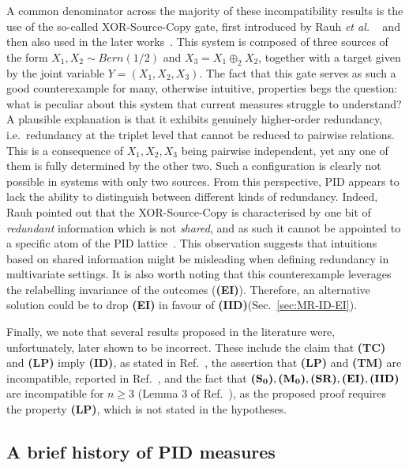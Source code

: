 \documentclass{article}
\makeatletter
\newcommand{\etal}{\textit{et al.\@} }
\newcommand{\ts}[1]{\ensuremath{_{\text{#1}}}}
\newcommand{\SR}{\textbf{(SR)}\xspace} %
\newcommand{\Sz}{\textbf{(S\ts{0})}\xspace} %
\newcommand{\Mz}{\textbf{(M\ts{0})}\xspace} %
\newcommand{\ID}{\textbf{(ID)}\xspace} %
\newcommand{\IID}{\textbf{(IID)}\xspace} %
\newcommand{\TM}{\textbf{(TM)}\xspace} %
\newcommand{\TC}{\textbf{(TC)}\xspace} %
\newcommand{\EI}{\textbf{(EI)}\xspace} %
\newcommand{\LP}{\textbf{(LP)}\xspace}
\makeatother
\begin{document}
A common denominator across the majority of these incompatibility results is the use of the so-called XOR-Source-Copy gate, first introduced by Rauh \etal~\cite{rauh2014reconsidering} and then also used in the later works~\cite{finn2018pointwise, kolchinsky2022novel, lyu2024explicit, matthias2025novel}. This system is composed of three sources of the form $X_1,X_2\sim Bern(1/2)$ and $X_3=X_1 \oplus_2 X_2$, together with a target given by the joint variable $Y=(X_1,X_2,X_3)$. The fact that this gate serves as such a good counterexample for many, otherwise intuitive, properties begs the question: what is peculiar about this system that current measures struggle to understand? A plausible explanation is that it exhibits genuinely higher-order redundancy, i.e.\ redundancy at the triplet level that cannot be reduced to pairwise relations. This is a consequence of $X_1,X_2,X_3$ being pairwise independent, yet any one of them is fully determined by the other two. Such a configuration is clearly not possible in systems with only two sources. From this perspective, PID appears to lack the ability to distinguish between different kinds of redundancy. Indeed, Rauh pointed out that the XOR-Source-Copy is characterised by one bit of \textit{redundant} information which is not \textit{shared}, and as such it cannot be appointed to a specific atom of the PID lattice~\cite{rauh2017secret}. This observation suggests that intuitions based on shared information might be misleading when defining redundancy in multivariate settings. It is also worth noting that this counterexample leverages the relabelling invariance of the outcomes (\EI). Therefore, an alternative solution could be to drop \EI in favour of \IID (Sec.~\ref{sec:MR-ID-EI}).

Finally, we note that several results proposed in the literature were, unfortunately, later shown to be incorrect. These include the claim that \TC and \LP imply \ID, as stated in Ref.~\cite{bertschinger2013shared}, the assertion that \LP and \TM are incompatible, reported in Ref.~\cite{banerjee2015synergy}, and the fact that $\Sz, \Mz, \SR, \EI, \IID$ are incompatible for $n \ge 3$ (Lemma 3 of Ref.~\cite{lyu2024explicit}), as the proposed proof requires the property \LP, which is not stated in the hypotheses.

\subsection{A brief history of PID measures}
\label{sec:brief_history}
\end{document}
